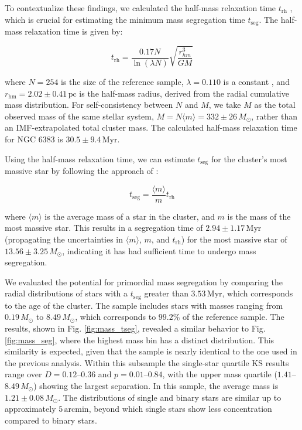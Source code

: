 \documentclass{aa}
\begin{document}
To contextualize these findings, we calculated the half-mass relaxation time $t_{\mathrm{rh}}$ \citep{1969ApJ...158L.139S}, which is crucial for estimating the minimum mass segregation time $t_{\mathrm{seg}}$. The half-mass relaxation time is given by:

\begin{equation}
t_{\mathrm{rh}} = \frac{0.17N}{\ln(\lambda N)}\sqrt{\frac{r_{hm}^3}{GM}}
\end{equation}

where $N=254$ is the size of the reference sample, $\lambda = 0.110$ is a constant \citep{1994MNRAS.268..257G}, and $r_\mathrm{hm} = 2.02 \pm 0.41\,\mathrm{pc}$ is the half-mass radius, derived from the radial cumulative mass distribution. For self-consistency between $N$ and $M$, we take $M$ as the total observed mass of the same stellar system, $M = N\langle m \rangle = 332 \pm 26\,M_\odot$, rather than an IMF-extrapolated total cluster mass. The calculated half-mass relaxation time for NGC 6383 is $30.5\pm 9.4\,\mathrm{Myr}$.

Using the half-mass relaxation time, we can estimate $t_{\mathrm{seg}}$ for the cluster's most massive star by following the approach of \citet{1969ApJ...158L.139S}:

\begin{equation}
t_{\mathrm{seg}} = \frac{\langle m \rangle}{m} t_{\mathrm{rh}}
\end{equation}

where $\langle m \rangle$ is the average mass of a star in the cluster, and $m$ is the mass of the most massive star. This results in a segregation time of $2.94 \pm 1.17\,\mathrm{Myr}$ (propagating the uncertainties in $\langle m \rangle$, $m$, and $t_{\mathrm{rh}}$) for the most massive star of $13.56 \pm 3.25\,M_\odot$, indicating it has had sufficient time to undergo mass segregation.

We evaluated the potential for primordial mass segregation by comparing the radial distributions of stars with a $t_{\mathrm{seg}}$ greater than $3.53\,\mathrm{Myr}$, which corresponds to the age of the cluster. The sample includes stars with masses ranging from $0.19\,M_\odot$ to $8.49\,M_\odot$, which corresponds to $99.2$\% of the reference sample. The results, shown in Fig. \ref{fig:mass_tseg}, revealed a similar behavior to Fig. \ref{fig:mass_seg}, where the highest mass bin has a distinct distribution. This similarity is expected, given that the sample is nearly identical to the one used in the previous analysis. Within this subsample the single-star quartile KS results range over $D=0.12$--$0.36$ and $p=0.01$--$0.84$, with the upper mass quartile ($1.41$--$8.49\,M_\odot$) showing the largest separation. In this sample, the average mass is $1.21 \pm 0.08\,M_\odot$. The distributions of single and binary stars are similar up to approximately $5\,\mathrm{arcmin}$, beyond which single stars show less concentration compared to binary stars.
\end{document}
